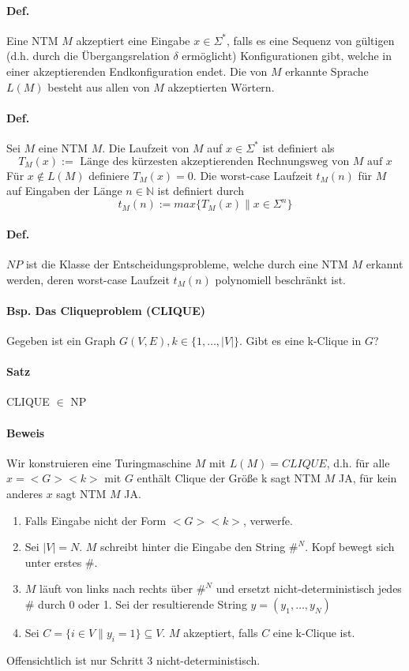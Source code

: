\paragraph*{Def.} Eine NTM $M$ akzeptiert eine Eingabe $x\in\Sigma^*$, falls es eine Sequenz von gültigen (d.h. durch die Übergangsrelation $\delta$ ermöglicht) Konfigurationen gibt, welche in einer akzeptierenden Endkonfiguration endet. Die von $M$ erkannte Sprache $L(M)$ besteht aus allen von $M$ akzeptierten Wörtern.

\paragraph*{Def.} Sei $M$ eine NTM $M$. Die Laufzeit von $M$ auf $x\in\Sigma^*$ ist definiert als $$ T_M(x):= \text{ Länge des kürzesten akzeptierenden Rechnungsweg von } M \text{ auf } x $$ Für $x \not\in L(M)$ definiere $T_M(x)=0.$ Die worst-case Laufzeit $t_M(n)$ für $M$ auf Eingaben der Länge $n\in\mathbb{N}$ ist definiert durch $$ t_M(n):=max\{ T_M(x) \| x\in\Sigma^n \} $$

\paragraph*{Def.} $NP$ ist die Klasse der Entscheidungsprobleme, welche durch eine NTM $M$ erkannt werden, deren worst-case Laufzeit $t_M(n)$ polynomiell beschränkt ist.

\paragraph*{Bsp. Das Cliqueproblem (CLIQUE)} Gegeben ist ein Graph $G(V,E), k \in \{1,\dots,|V|\}$. Gibt es eine k-Clique in $G$?

\paragraph*{Satz} CLIQUE $\in$ NP


\paragraph*{Beweis} Wir konstruieren eine Turingmaschine $M$ mit $L(M)=CLIQUE$, d.h. für alle $x=<G><k>$ mit $G$ enthält Clique der Größe k sagt NTM $M$ JA, für kein anderes $x$ sagt NTM $M$ JA.
\begin{enumerate}
	\item Falls Eingabe nicht der Form $<G><k>$, verwerfe.
	\item Sei $|V|=N$. $M$ schreibt hinter die Eingabe den String $\#^N$. Kopf bewegt sich unter erstes \#.
	\item $M$ läuft von links nach rechts über $\#^N$ und ersetzt nicht-deterministisch jedes \# durch 0 oder 1. Sei der resultierende String $y=(y_1,\dots,y_N)$
	\item Sei $C=\{ i \in V \| y_i = 1 \} \subseteq V$. $M$ akzeptiert, falls $C$ eine k-Clique ist.
\end{enumerate}
Offensichtlich ist nur Schritt 3 nicht-deterministisch.


